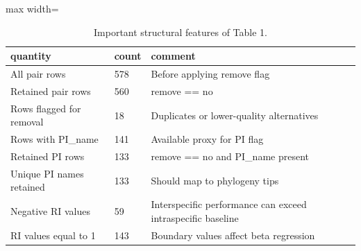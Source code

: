 \begin{table}
\caption{Important structural features of Table 1.}
\label{tab:table1_quality}
\begin{adjustbox}{max width=\textwidth}
\begin{tabular}{lll}
\toprule
quantity & count & comment \\
\midrule
All pair rows & 578 & Before applying remove flag \\
Retained pair rows & 560 & remove == no \\
Rows flagged for removal & 18 & Duplicates or lower-quality alternatives \\
Rows with PI\_name & 141 & Available proxy for PI flag \\
Retained PI rows & 133 & remove == no and PI\_name present \\
Unique PI names retained & 133 & Should map to phylogeny tips \\
Negative RI values & 59 & Interspecific performance can exceed intraspecific baseline \\
RI values equal to 1 & 143 & Boundary values affect beta regression \\
\bottomrule
\end{tabular}
\end{adjustbox}
\end{table}
